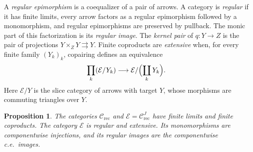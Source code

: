 \documentclass[11pt]{article}
\newtheorem{proposition}[theorem]{Proposition}
\begin{document}
A \emph{regular epimorphism} is a coequalizer of a pair of arrows.
A category is \emph{regular} if it has finite limits, every arrow
factors as a regular epimorphism followed by a monomorphism, and
regular epimorphisms are preserved by pullback. The monic part of
this factorization is its \emph{regular image}. The \emph{kernel
pair} of $q:Y\to Z$ is the pair of projections
$Y\times_ZY\rightrightarrows Y$.
Finite coproducts are \emph{extensive} when, for every finite family
$(Y_k)_k$, copairing defines an equivalence
\[
 \prod_k(\mathcal E/Y_k)\longrightarrow
 \mathcal E/\Bigl(\coprod_kY_k\Bigr).
\]
Here $\mathcal E/Y$ is the slice category of arrows with target $Y$,
whose morphisms are commuting triangles over $Y$.

\begin{proposition}\label{prop:fork-total}
The categories $\mathcal C_{\mathrm{rec}}$ and
$\mathcal E=\mathcal C_{\mathrm{rec}}^J$ have finite limits and
finite coproducts. The category $\mathcal E$ is regular and
extensive. Its monomorphisms are componentwise injections, and its
regular images are the componentwise c.e.\ images.
\end{proposition}
\end{document}
